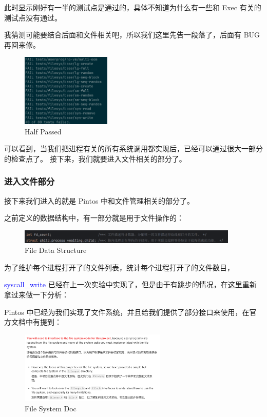 \documentclass[14pt,a4paper,UTF8,twoside]{article}
\renewcommand{\texttt}[1]{\textcolor{blue}{\ttfamily #1}}
\begin{document}
此时显示刚好有一半的测试点是通过的，具体不知道为什么有一些和 Exec 有关的测试点没有通过。

我猜测可能要结合后面和文件相关吧，所以我们这里先告一段落了，后面有 BUG 再回来修。

\begin{figure}[H]
    \centering
    \includegraphics[width=0.38\textwidth]{img6/passhalf.png}
    \caption{Half Passed}
    \label{fig:part3}
\end{figure}

可以看到，当我们把进程有关的所有系统调用都实现后，已经可以通过很大一部分的检查点了。
接下来，我们就要进入文件相关的部分了。

\subsubsection{进入文件部分}

接下来我们进入的就是 Pintos 中和文件管理相关的部分了。

之前定义的数据结构中，有一部分就是用于文件操作的：

\begin{figure}[H]
    \centering
    \includegraphics[width=0.935\textwidth]{img6/new.png}
    \caption{File Data Structure}
    \label{fig:file}
\end{figure}
    
为了维护每个进程打开了的文件列表，统计每个进程打开了的文件数目，

\texttt{syscall\_write} 已经在上一次实验中实现了，但是由于有跳步的情况，在这里重新拿过来做一下分析：

\begin{rmr}
Pintos 中已经为我们实现了文件系统，并且给我们提供了部分接口来使用，在官方文档中有提到：
\end{rmr}

\begin{figure}[H]
    \centering
    \includegraphics[width=0.62\textwidth]{img6/API.png}
    \caption{File System Doc}
    \label{fig:fsdoc}
\end{figure}
\end{document}
